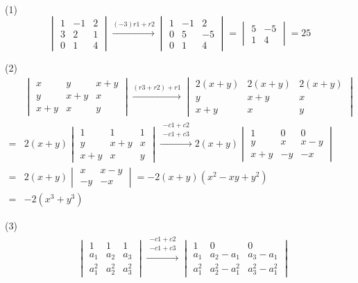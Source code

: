 \begin{solution}\

\enum
\item[(1)]
$$\begin{vmatrix} 1 & -1 & 2 \\ 3 & 2 & 1 \\ 0 & 1 & 4 \end{vmatrix} \xrightarrow{(-3)r1+r2} \begin{vmatrix} 1 & -1 & 2 \\ 0 & 5 & -5 \\ 0 & 1 & 4 \end{vmatrix} = \begin{vmatrix} 5 & -5 \\ 1 & 4 \end{vmatrix} = 25$$
\item[(2)]
\begin{align*}
& \begin{vmatrix} x & y & x+y \\ y & x+y & x \\ x+y & x & y \end{vmatrix} \xrightarrow{(r3+r2)+r1} \begin{vmatrix} 2(x+y) & 2(x+y) & 2(x+y) \\ y & x+y & x \\ x+y & x & y \end{vmatrix} \\
= & 2(x+y)\begin{vmatrix} 1 & 1 & 1 \\ y & x+y & x \\ x+y & x & y \end{vmatrix} \xrightarrow{\substack{-c1+c2 \\ -c1+c3}} 2(x+y)\begin{vmatrix} 1 & 0 & 0 \\ y & x & x-y \\ x+y & -y & -x \end{vmatrix} \\
= & 2(x+y)\begin{vmatrix} x & x-y \\ -y & -x \end{vmatrix} = -2(x+y)(x^2-xy+y^2) \\
= & -2(x^3+y^3)
\end{align*}
\item[(3)]
\begin{align*}
& \begin{vmatrix} 1 & 1 & 1 \\ a_1 & a_2 & a_3 \\ a_1^2 & a_2^2 & a_3^2 \end{vmatrix} \xrightarrow{\substack{-c1+c2 \\ -c1+c3}} \begin{vmatrix} 1 & 0 & 0 \\ a_1 & a_2 - a_1 & a_3 - a_1 \\ a_1^2 & a_2^2 - a_1^2 & a_3^2 - a_1^2 \end{vmatrix} \\

\end{align*}
\end{solution}
